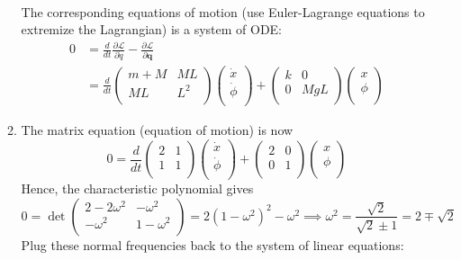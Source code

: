 \documentclass[a4paper]{article}
\begin{document}
\begin{ans}
\begin{enumerate}[label=(\alph*)]
\begin{enumerate}[label=(\roman*)]
\begin{align}
\end{align}
The corresponding equations of motion (use Euler-Lagrange equations to extremize the Lagrangian) is a system of ODE:
\begin{align}
0&=\frac{d}{dt}\frac{\partial\mathcal{L}}{\partial\dot{q}}-\frac{\partial\mathcal{L}}{\partial\mathbf{q}}\nonumber\\&=\frac{d}{dt}\begin{pmatrix}m+M&ML\\ML&L^2\\\end{pmatrix}\begin{pmatrix}\dot{x}\\\dot{\phi}\\\end{pmatrix}+\begin{pmatrix}k&0\\0&MgL\\\end{pmatrix}\begin{pmatrix}x\\\phi\\\end{pmatrix}\nonumber
\end{align}
\item The matrix equation (equation of motion) is now
$$0=\frac{d}{dt}\begin{pmatrix}2&1\\1&1\\\end{pmatrix}\begin{pmatrix}\dot{x}\\\dot{\phi}\\\end{pmatrix}+\begin{pmatrix}2&0\\0&1\\\end{pmatrix}\begin{pmatrix}x\\\phi\\\end{pmatrix}$$
Hence, the characteristic polynomial gives
$$0=\det\begin{pmatrix}2-2\omega^2&-\omega^2\\-\omega^2&1-\omega^2\\\end{pmatrix}=2(1-\omega^2)^2-\omega^2\implies\omega^2=\frac{\sqrt{2}}{\sqrt{2}\pm 1}=2\mp\sqrt{2}$$
Plug these normal frequencies back to the system of linear equations:

\end{enumerate}
\end{enumerate}
\end{ans}
\end{document}
